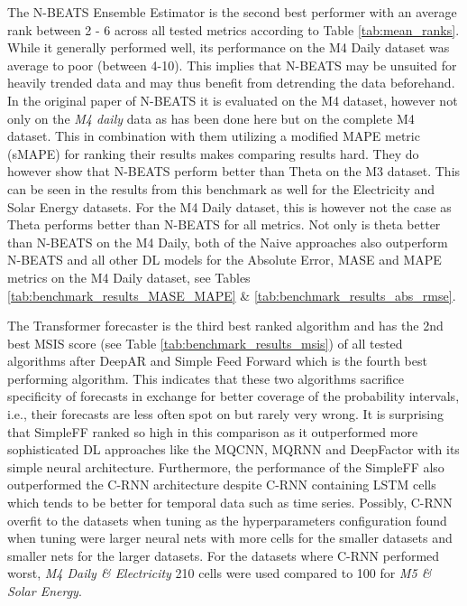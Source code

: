 The N-BEATS Ensemble Estimator is the second best performer with an average rank between 2 - 6 across all tested metrics according to Table \ref{tab:mean_ranks}. While it generally performed well, its performance on the M4 Daily dataset was average to poor (between 4-10). This implies that N-BEATS may be unsuited for heavily trended data and may thus benefit from detrending the data beforehand. In the original paper of N-BEATS it is evaluated on the M4 dataset, however not only on the \textit{M4 daily} data as has been done here but on the complete M4 dataset. This in combination with them utilizing a modified MAPE metric (sMAPE) for ranking their results makes comparing results hard. They do however show that N-BEATS perform better than Theta on the M3 dataset. This can be seen in the results from this benchmark as well for the Electricity and Solar Energy datasets. For the M4 Daily dataset, this is however not the case as Theta performs better than N-BEATS for all metrics. Not only is theta better than N-BEATS on the M4 Daily, both of the Naive approaches also outperform N-BEATS and all other DL models for the Absolute Error, MASE and MAPE metrics on the M4 Daily dataset, see Tables \ref{tab:benchmark_results_MASE_MAPE} \& \ref{tab:benchmark_results_abs_rmse}.

The Transformer forecaster is the third best ranked algorithm and has the 2nd best MSIS score (see Table \ref{tab:benchmark_results_msis}) of all tested algorithms after DeepAR and Simple Feed Forward which is the fourth best performing algorithm. This indicates that these two algorithms sacrifice specificity of forecasts in exchange for better coverage of the probability intervals, i.e., their forecasts are less often spot on but rarely very wrong. It is surprising that SimpleFF ranked so high in this comparison as it outperformed more sophisticated DL approaches like the MQCNN, MQRNN and DeepFactor with its simple neural architecture. Furthermore, the performance of the SimpleFF also outperformed the C-RNN architecture despite C-RNN containing LSTM cells which tends to be better for temporal data such as time series. Possibly, C-RNN overfit to the datasets when tuning as the hyperparameters configuration found when tuning were larger neural nets with more cells for the smaller datasets and smaller nets for the larger datasets. For the datasets where C-RNN performed worst, \textit{M4 Daily \& Electricity} 210 cells were used compared to 100 for \textit{M5 \& Solar Energy}.

